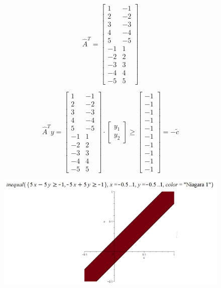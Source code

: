 \documentclass{article}
\begin{document}
\begin{equation}
    \hat{A}^T =
    \begin{bmatrix}
        1 & -1 \\
        2 & -2 \\
        3 & -3 \\
        4 & -4 \\
        5 & -5 \\
        -1 & 1 \\
        -2 & 2 \\
        -3 & 3 \\
        -4 & 4 \\
        -5 & 5
    \end{bmatrix}
\end{equation}

\begin{equation}
    \hat{A}^Ty =
    \begin{bmatrix}
        1 & -1 \\
        2 & -2 \\
        3 & -3 \\
        4 & -4 \\
        5 & -5 \\
        -1 & 1 \\
        -2 & 2 \\
        -3 & 3 \\
        -4 & 4 \\
        -5 & 5
    \end{bmatrix}
    \cdot
    \begin{bmatrix}
        y_1 \\
        y_2
    \end{bmatrix}
    \geq
    \begin{bmatrix}
        -1 \\
        -1 \\
        -1 \\
        -1 \\
        -1 \\
        -1 \\
        -1 \\
        -1 \\
        -1 \\
        -1
    \end{bmatrix}
    =
    -\tilde{c}
\end{equation}

\begin{figure}[h]
    \centering
    \includegraphics[width=\textwidth]{plot}
\end{figure}
\end{document}
